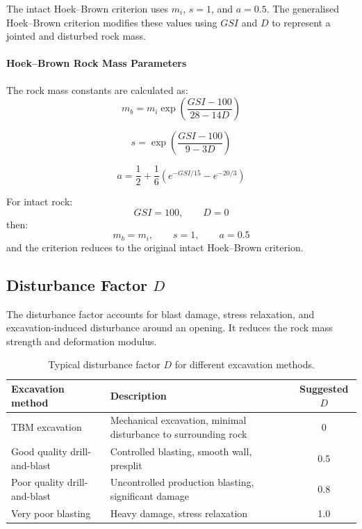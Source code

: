 \begin{keybox}
The intact Hoek--Brown criterion uses \(m_i\), \(s=1\), and \(a=0.5\). 
The generalised Hoek--Brown criterion modifies these values using \(GSI\) and \(D\)
to represent a jointed and disturbed rock mass.
\end{keybox}

\paragraph{Hoek--Brown Rock Mass Parameters}

The rock mass constants are calculated as:
\[
m_b =
m_i
\exp
\left(
\frac{GSI-100}{28-14D}
\right)
\]

\[
s =
\exp
\left(
\frac{GSI-100}{9-3D}
\right)
\]

\[
a =
\frac{1}{2}
+
\frac{1}{6}
\left(
e^{-GSI/15}
-
e^{-20/3}
\right)
\]

\begin{calcbox}
For intact rock:
\[
GSI=100,\qquad D=0
\]
then:
\[
m_b=m_i,\qquad s=1,\qquad a=0.5
\]
and the criterion reduces to the original intact Hoek--Brown criterion.
\end{calcbox}

\subsection{Disturbance Factor \(D\)}

The disturbance factor accounts for blast damage, stress relaxation, and excavation-induced
disturbance around an opening. It reduces the rock mass strength and deformation modulus.

\begin{table}[H]
\centering
\small
\begin{tabularx}{\textwidth}{l Y c}
\toprule
\textbf{Excavation method} & \textbf{Description} & \textbf{Suggested \(D\)} \\
\midrule
TBM excavation & Mechanical excavation, minimal disturbance to surrounding rock & 0 \\
Good quality drill-and-blast & Controlled blasting, smooth wall, presplit & 0.5 \\
Poor quality drill-and-blast & Uncontrolled production blasting, significant damage & 0.8 \\
Very poor blasting & Heavy damage, stress relaxation & 1.0 \\
\bottomrule
\end{tabularx}
\caption{Typical disturbance factor \(D\) for different excavation methods.}
\label{tab:Dfactor}
\end{table}

